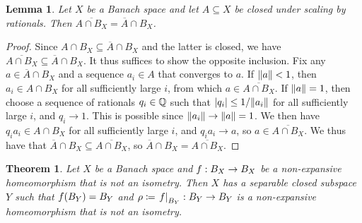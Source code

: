 \documentclass{amsart}
\newtheorem{theorem}{Theorem}
\newtheorem{lemma}{Lemma}
\theoremstyle{definition}
\newcommand{\clo}[1]{\overline{#1}}
\begin{document}
\begin{lemma}
    \label{rat-scaling}
    Let $X$ be a Banach space and let $A \subseteq X$ be closed under scaling by rationals. Then $\clo{A \cap B_X} = \clo{A} \cap B_X$.
\end{lemma}

\begin{proof}
Since $A \cap B_X \subseteq \clo{A} \cap B_X$ and the latter is closed, we
have $\clo{A \cap B_X} \subseteq \clo{A} \cap B_X$. It thus suffices to show
the opposite inclusion. Fix any $a \in \clo{A} \cap B_X$ and a sequence $a_i
\in A$ that converges to $a$. If $\norm{a} < 1$, then $a_i \in A \cap B_X$ for
all sufficiently large $i$, from which $a \in \clo{A \cap B_X}$. If $\norm{a} =
1$, then choose a sequence of rationals $q_i \in \mathbb{Q}$ such that $\abs{q_i} \leq 1/
\norm{a_i}$ for all sufficiently large $i$, and $q_i \to 1$. This is possible
since $\norm{a_i} \to \norm{a} = 1$. We then have $q_i a_i \in A \cap B_X$ for all
sufficiently large $i$, and $q_i a_i \to a$, so $a \in \clo{A \cap B_X}$. We thus
have that $\clo{A} \cap B_X \subseteq \clo{A \cap B_X}$, so $\clo{A} \cap B_X =
\clo{A \cap B_X}$.
\end{proof}

\newcommand\restr[2]{\ensuremath{\left.#1\right|_{#2}}}

\begin{theorem}
    Let $X$ be a Banach space and $f: B_X \to B_X$ be a non-expansive homeomorphism that is not an isometry. Then $X$ has a separable closed subspace $Y$ such that $f(B_Y) = B_Y$ and $\rho \coloneqq \restr{\lip}{B_Y} : B_Y \to B_Y$ is a non-expansive homeomorphism that is not an isometry.
\end{theorem}
\end{document}
